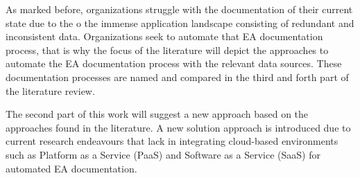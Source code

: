 As marked before, organizations struggle with the documentation of their current state due to the o the immense application landscape consisting of redundant and inconsistent data. Organizations seek to automate that EA documentation process, that is why the focus of the literature will depict the approaches to automate the EA documentation process with the relevant data sources. These documentation processes are named and compared in the third and forth part of the literature review.

The second part of this work will suggest a new approach based on the approaches found in the literature. A new solution approach is introduced due to current research endeavours that lack in integrating cloud-based environments such as Platform as a Service (PaaS) and Software as a Service (SaaS) for automated EA documentation. 

